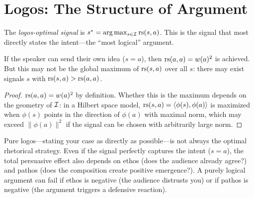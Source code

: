 \section{Logos: The Structure of Argument}

\begin{definition}
\label{def:logos-max}
The \emph{logos-optimal signal} is
$s^* = \arg\max_{s \in \mathcal{I}} \mathrm{rs}(s, a)$.
This is the signal that most directly states the intent---the ``most logical''
argument.
\end{definition}

\begin{proposition}
\label{prop:logos-self}
If the speaker can send their own idea ($s = a$), then
$\mathrm{rs}(a, a) = w(a)^2$ is achieved.  But this may not be the global maximum
of $\mathrm{rs}(s, a)$ over all $s$: there may exist signals $s$ with
$\mathrm{rs}(s, a) > \mathrm{rs}(a, a)$.
\end{proposition}

\begin{proof}
$\mathrm{rs}(a, a) = w(a)^2$ by definition.  Whether this is the maximum depends
on the geometry of $\mathcal{I}$: in a Hilbert space model, $\mathrm{rs}(s, a) =
\langle \phi(s), \phi(a) \rangle$ is maximized when $\phi(s)$ points in the
direction of $\phi(a)$ with maximal norm, which may exceed $\|\phi(a)\|^2$
if the signal can be chosen with arbitrarily large norm.
\end{proof}

\begin{interpretation}
\label{interp:limits-logic}
Pure logos---stating your case as directly as possible---is not always the
optimal rhetorical strategy.  Even if the signal perfectly captures the
intent ($s = a$), the total persuasive effect also depends on ethos
(does the audience already agree?) and pathos (does the composition create
positive emergence?).  A purely logical argument can fail if ethos is negative
(the audience distrusts you) or if pathos is negative (the argument triggers
a defensive reaction).
\end{interpretation}

